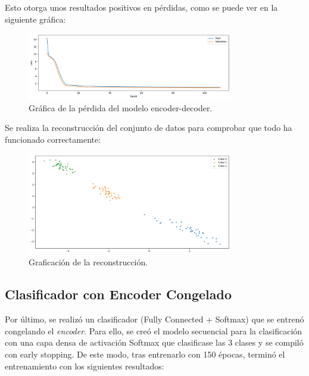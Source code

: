 \documentclass[paper=a4, fontsize=11pt]{scrartcl} %
\numberwithin{equation}{section} %
\numberwithin{figure}{section} %
\numberwithin{table}{section} %
\begin{document}
Esto otorga unos resultados positivos en pérdidas, como se puede ver en la siguiente gráfica:

\begin{figure}[H]
\centering
\includegraphics[width=0.8\textwidth]{images/loss_encoder.png}
\caption{Gráfica de la pérdida del modelo encoder-decoder.}
\end{figure}

Se realiza la reconstrucción del conjunto de datos para comprobar que todo ha funcionado correctamente:

\begin{figure}[H]
\centering
\includegraphics[width=0.8\textwidth]{images/reconstruction.png}
\caption{Graficación de la reconstrucción.}
\end{figure}


\subsection{Clasificador con Encoder Congelado}

Por último, se realizó un clasificador (Fully Connected + Softmax) que se entrenó congelando el \textit{encoder}. Para ello, se creó el modelo secuencial para la clasificación con una capa densa de activación Softmax que clasificase las 3 clases y se compiló con early stopping.
De este modo, tras entrenarlo con 150 épocas, terminó el entrenamiento con los siguientes resultados:
\end{document}
